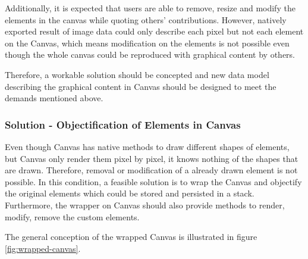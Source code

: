 Additionally, it is expected that users are able to remove, resize and modify the elements in the canvas while quoting others' contributions. However, natively exported result of image data could only describe each pixel but not each element on the Canvas, which means modification on the elements is not possible even though the whole canvas could be reproduced with graphical content by others. 

Therefore, a workable solution should be concepted and new data model describing the graphical content in Canvas should be designed to meet the demands mentioned above.

\subsubsection{Solution - Objectification of Elements in Canvas}

Even though Canvas has native methods to draw different shapes of elements, but Canvas only render them pixel by pixel, it knows nothing of the shapes that are drawn. Therefore, removal or modification of a already drawn element is not possible. In this condition, a feasible solution is to wrap the Canvas and objectify the original elements which could be stored and persisted in a stack. Furthermore, the wrapper on Canvas should also provide methods to render, modify, remove the custom elements. 

The general conception of the wrapped Canvas is illustrated in figure \ref{fig:wrapped-canvas}.

